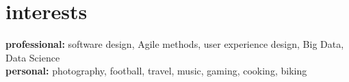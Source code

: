 \documentclass[]{friggeri-cv}
\begin{document}

\section{interests}

\textbf{\headingfont professional:} software design, Agile methods, user experience design, Big Data, Data Science \\ 
\textbf{\headingfont personal:} photography, football, travel, music, gaming, cooking, biking



\end{document}
